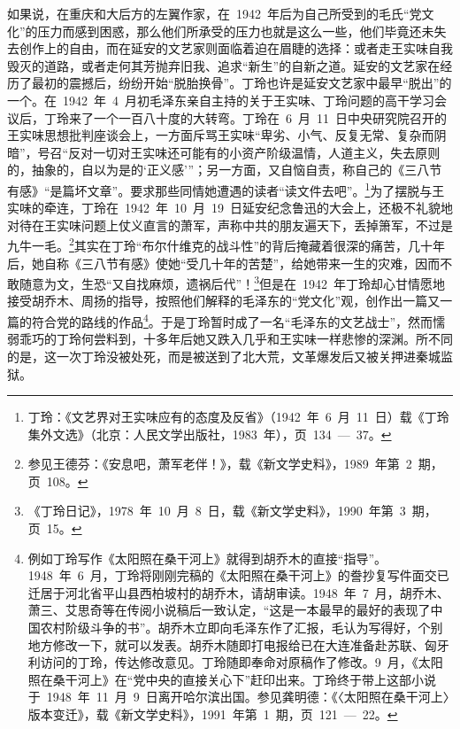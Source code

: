 如果说，在重庆和大后方的左翼作家，在~1942~年后为自己所受到的毛氏“党文化”的压力而感到困惑，那么他们所承受的压力也就是这么一些，他们毕竟还未失去创作上的自由，而在延安的文艺家则面临着迫在眉睫的选择：或者走王实味自我毁灭的道路，或者走何其芳抛弃旧我、追求“新生”的自新之道。延安的文艺家在经历了最初的震撼后，纷纷开始“脱胎换骨”。丁玲也许是延安文艺家中最早“脱出”的一个。在~1942~年~4~月初毛泽东亲自主持的关于王实味、丁玲问题的高干学习会议后，丁玲来了一个一百八十度的大转弯。丁玲在~6~月~11~日中央研究院召开的王实味思想批判座谈会上，一方面斥骂王实味“卑劣、小气、反复无常、复杂而阴暗”，号召“反对一切对王实味还可能有的小资产阶级温情，人道主义，失去原则的，抽象的，自以为是的‘正义感’”；另一方面，又自恼自责，称自己的《三八节有感》“是篇坏文章”。要求那些同情她遭遇的读者“读文件去吧”。\footnote{丁玲：《文艺界对王实味应有的态度及反省》（1942~年~6~月~11~日）载《丁玲集外文选》（北京：人民文学出版社，1983~年），页~134~—~37。}为了摆脱与王实味的牵连，丁玲在~1942~年~10~月~19~日延安纪念鲁迅的大会上，还极不礼貌地对待在王实味问题上仗义直言的萧军，声称中共的朋友遍天下，丢掉箫军，不过是九牛一毛。\footnote{参见王德芬：《安息吧，萧军老伴！》，载《新文学史料》，1989~年第~2~期，页~108。}其实在丁玲“布尔什维克的战斗性”的背后掩藏着很深的痛苦，几十年后，她自称《三八节有感》使她“受几十年的苦楚”，给她带来一生的灾难，因而不敢随意为文，生恐“又自找麻烦，遗祸后代”！\footnote{《丁玲日记》，1978~年~10~月~8~日，载《新文学史料》，1990~年第~3~期，页~15。}但是在~1942~年丁玲却心甘情愿地接受胡乔木、周扬的指导，按照他们解释的毛泽东的“党文化”观，创作出一篇又一篇的符合党的路线的作品\footnote{例如丁玲写作《太阳照在桑干河上》就得到胡乔木的直接“指导”。1948~年~6~月，丁玲将刚刚完稿的《太阳照在桑干河上》的誊抄复写件面交已迁居于河北省平山县西柏坡村的胡乔木，请胡审读。1948~年~7~月，胡乔木、萧三、艾思奇等在传阅小说稿后一致认定，“这是一本最早的最好的表现了中国农村阶级斗争的书”。胡乔木立即向毛泽东作了汇报，毛认为写得好，个别地方修改一下，就可以发表。胡乔木随即打电报给已在大连准备赴苏联、匈牙利访问的丁玲，传达修改意见。丁玲随即奉命对原稿作了修改。9~月，《太阳照在桑干河上》在“党中央的直接关心下”赶印出来。丁玲终于带上这部小说于~1948~年~11~月~9~日离开哈尔滨出国。参见龚明德：《〈太阳照在桑干河上〉版本变迁》，载《新文学史料》，1991~年第~1~期，页~121~—~22。}。于是丁玲暂时成了一名“毛泽东的文艺战士”，然而懦弱乖巧的丁玲何尝料到，十多年后她又跌入几乎和王实味一样悲惨的深渊。所不同的是，这一次丁玲没被处死，而是被送到了北大荒，文革爆发后又被关押进秦城监狱。
